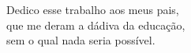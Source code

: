 \begin{comment}
\begin{fichacatalografica}
	\vspace*{\fill}
	\hrule
	\begin{center}
	\begin{minipage}[c]{12.5cm}

	\imprimirautor

	\hspace{0.5cm} \imprimirtitulo / \imprimirautor. -- \imprimirlocal,
	\imprimirdata-

	\hspace{0.5cm} \pageref{LastPage} p. : il. (algumas color.) ; 30 cm.\\
	\hspace{0.5cm} \imprimirorientadorRotulo~\imprimirorientador\\
	\hspace{0.5cm}
	\parbox[t]{\textwidth}{\imprimirtipotrabalho~--~\imprimirinstituicao,
	\imprimirdata.}\\

	\hspace{0.5cm}
		1. Paradigma Orientado a Notificações. 2. Desenvolvimento Orientado a
  Testes. 3. Programação Genérica. 4. C++ Moderno. I. Linhares, Robson Ribeiro;
  Simão, Jean Marcelo. II. Universidade Tecnológica Federal do Paraná IV.
  \imprimirtitulo\\

	\hspace{8.75cm} CDU 00:000:000.0\\

	\end{minipage}
	\end{center}
	\hrule
\end{fichacatalografica}
\cleardoublepage
\end{comment}




\begin{dedicatoria}
\null
\vfill
\begin{flushright}
Dedico esse trabalho aos meus pais,\\
que me deram a dádiva da educação, \\
sem o qual nada seria possível.
\end{flushright}


\end{dedicatoria}

